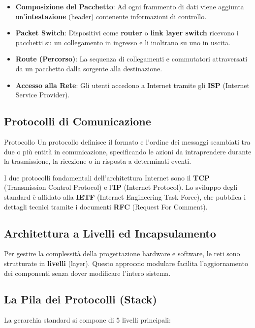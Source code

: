\documentclass[12pt,a4paper,oneside]{book}
\begin{document}
\begin{itemize}
    \item \textbf{Composizione del Pacchetto}: Ad ogni frammento di dati viene aggiunta un'\textbf{intestazione} (header) contenente informazioni di controllo.
    \item \textbf{Packet Switch}: Dispositivi come \textbf{router} o \textbf{link layer switch} ricevono i pacchetti su un collegamento in ingresso e li inoltrano su uno in uscita.
    \item \textbf{Route (Percorso)}: La sequenza di collegamenti e commutatori attraversati da un pacchetto dalla sorgente alla destinazione.
    \item \textbf{Accesso alla Rete}: Gli utenti accedono a Internet tramite gli \textbf{ISP} (Internet Service Provider).
\end{itemize}

\subsection{Protocolli di Comunicazione}

\begin{definition}{Protocollo}{}
Un protocollo definisce il formato e l'ordine dei messaggi scambiati tra due o più entità in comunicazione, specificando le azioni da intraprendere durante la trasmissione, la ricezione o in risposta a determinati eventi.
\end{definition}

I due protocolli fondamentali dell'architettura Internet sono il \textbf{TCP} (Transmission Control Protocol) e l'\textbf{IP} (Internet Protocol). Lo sviluppo degli standard è affidato alla \textbf{IETF} (Internet Engineering Task Force), che pubblica i dettagli tecnici tramite i documenti \textbf{RFC} (Request For Comment).

\subsection{Architettura a Livelli ed Incapsulamento}

Per gestire la complessità della progettazione hardware e software, le reti sono strutturate in \textbf{livelli} (layer). Questo approccio modulare facilita l'aggiornamento dei componenti senza dover modificare l'intero sistema.

\subsection{La Pila dei Protocolli (Stack)}
La gerarchia standard si compone di 5 livelli principali:
\end{document}
